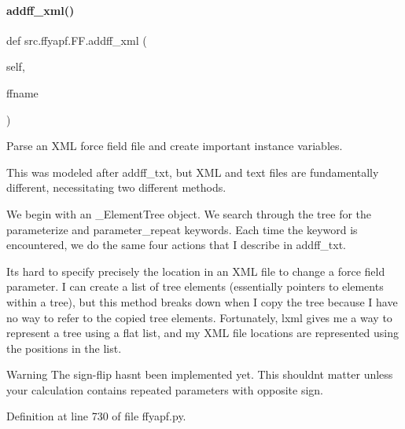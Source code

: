 \paragraph{\texorpdfstring{addff\+\_\+xml()}{addff\_xml()}}
{\footnotesize\ttfamily def src.\+ffyapf.\+F\+F.\+addff\+\_\+xml (\begin{DoxyParamCaption}\item[{}]{self,  }\item[{}]{ffname }\end{DoxyParamCaption})}



Parse an X\+ML force field file and create important instance variables. 

This was modeled after addff\+\_\+txt, but X\+ML and text files are fundamentally different, necessitating two different methods.

We begin with an \+\_\+\+Element\+Tree object. We search through the tree for the \textquotesingle{}parameterize\textquotesingle{} and \textquotesingle{}parameter\+\_\+repeat\textquotesingle{} keywords. Each time the keyword is encountered, we do the same four actions that I describe in addff\+\_\+txt.

It\textquotesingle{}s hard to specify precisely the location in an X\+ML file to change a force field parameter. I can create a list of tree elements (essentially pointers to elements within a tree), but this method breaks down when I copy the tree because I have no way to refer to the copied tree elements. Fortunately, lxml gives me a way to represent a tree using a flat list, and my X\+ML file \textquotesingle{}locations\textquotesingle{} are represented using the positions in the list.

\begin{DoxyWarning}{Warning}
The sign-\/flip hasn\textquotesingle{}t been implemented yet. This shouldn\textquotesingle{}t matter unless your calculation contains repeated parameters with opposite sign. 
\end{DoxyWarning}


Definition at line 730 of file ffyapf.\+py.

